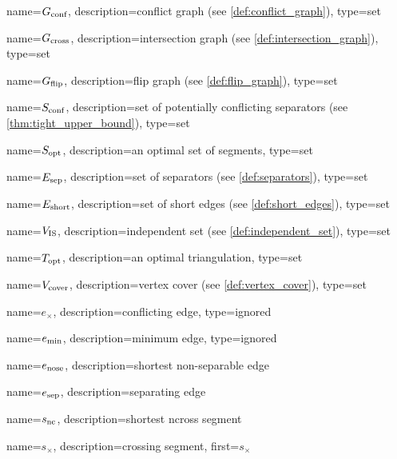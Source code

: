 {
  name={\ensuremath{G_\textnormal{conf}}},
  description={conflict graph (see \cref{def:conflict_graph})},
  type={set}
}

{
  name={\ensuremath{G_\textnormal{cross}}},
  description={intersection graph (see \cref{def:intersection_graph})},
  type={set}
}

{
  name={\ensuremath{G_\textnormal{flip}}},
  description={flip graph (see \cref{def:flip_graph})},
  type={set}
}

{
  name={\ensuremath{S_\textnormal{conf}}},
  description={set of potentially conflicting separators (see \cref{thm:tight_upper_bound})},
  type={set}
}

{
  name={\ensuremath{S_\textnormal{opt}}},
  description={an optimal set of segments},
  type={set}
}

{
  name={\ensuremath{E_\textnormal{sep}}},
  description={set of separators (see \cref{def:separators})},
  type={set}
}

{
  name={\ensuremath{E_\textnormal{short}}},
  description={set of short edges (see \cref{def:short_edges})},
  type={set}
}

{
  name={\ensuremath{V_\textnormal{IS}}},
  description={independent set (see \cref{def:independent_set})},
  type={set}
}

{
  name={\ensuremath{T_\textnormal{opt}}},
  description={an optimal triangulation},
  type={set}
}

{
  name={\ensuremath{V_\textnormal{cover}}},
  description={vertex cover (see \cref{def:vertex_cover})},
  type={set}
}

{
  name={\ensuremath{e_{\times}}},
  description={conflicting edge},
  type={ignored}
}

{
  name={\ensuremath{e_\textnormal{min}}},
  description={minimum edge},
  type={ignored}
}

{
  name={\ensuremath{e_\textnormal{nose}}},
  description={shortest non-separable edge}
}

{
  name={\ensuremath{e_\textnormal{sep}}},
  description={separating edge}
}

{
  name={\ensuremath{s_\textnormal{nc}}},
  description={shortest \gls{ncross} segment}
}

{
  name={\ensuremath{s_{\times}}},
  description={crossing segment},
  first={\ensuremath{s_{\times}}}
}

